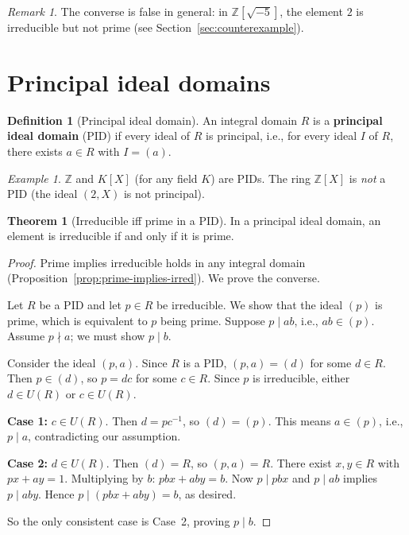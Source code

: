 \documentclass[12pt,a4paper,openany]{book}
\theoremstyle{definition}
\newtheorem{definition}{Definition}[chapter]
\newtheorem{theorem}{Theorem}[chapter]
\theoremstyle{remark}
\newtheorem{remark}{Remark}[chapter]
\newtheorem{example}{Example}[chapter]
\begin{document}
\begin{remark}\label{rem:irred-not-prime}
The converse is false in general: in $\mathbb{Z}[\sqrt{-5}]$, the element $2$ is irreducible but not prime (see Section~\ref{sec:counterexample}).
\end{remark}

\section{Principal ideal domains}\label{sec:PID}

\begin{definition}[Principal ideal domain]\label{def:PID}
An integral domain $R$ is a \textbf{principal ideal domain} (PID) if every ideal of $R$ is principal, i.e., for every ideal $I$ of $R$, there exists $a\in R$ with $I=(a)$.
\end{definition}

\begin{example}\label{ex:PID}
$\mathbb{Z}$ and $K[X]$ (for any field $K$) are PIDs. The ring $\mathbb{Z}[X]$ is \emph{not} a PID (the ideal $(2,X)$ is not principal).
\end{example}

\begin{theorem}[Irreducible iff prime in a PID]\label{thm:irred-iff-prime-PID}
In a principal ideal domain, an element is irreducible if and only if it is prime.
\end{theorem}

\begin{proof}
Prime implies irreducible holds in any integral domain (Proposition~\ref{prop:prime-implies-irred}). We prove the converse.

Let $R$ be a PID and let $p\in R$ be irreducible. We show that the ideal $(p)$ is prime, which is equivalent to $p$ being prime. Suppose $p\mid ab$, i.e., $ab\in(p)$. Assume $p\nmid a$; we must show $p\mid b$.

Consider the ideal $(p,a)$. Since $R$ is a PID, $(p,a)=(d)$ for some $d\in R$. Then $p\in(d)$, so $p=dc$ for some $c\in R$. Since $p$ is irreducible, either $d\in U(R)$ or $c\in U(R)$.

\textbf{Case 1:} $c\in U(R)$. Then $d=pc^{-1}$, so $(d)=(p)$. This means $a\in(p)$, i.e., $p\mid a$, contradicting our assumption.

\textbf{Case 2:} $d\in U(R)$. Then $(d)=R$, so $(p,a)=R$. There exist $x,y\in R$ with $px+ay=1$. Multiplying by $b$: $pbx+aby=b$. Now $p\mid pbx$ and $p\mid ab$ implies $p\mid aby$. Hence $p\mid(pbx+aby)=b$, as desired.

So the only consistent case is Case~2, proving $p\mid b$.
\end{proof}
\end{document}

